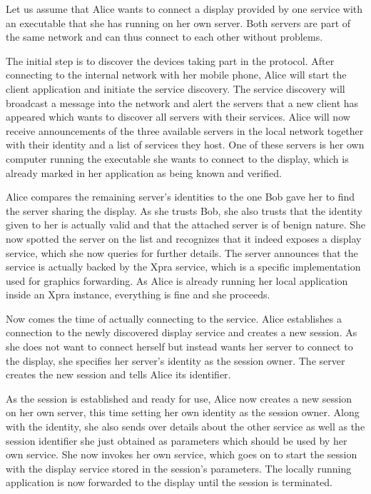 Let us assume that Alice wants to connect a display provided by one service with an executable that she has running on her own server.
Both servers are part of the same network and can thus connect to each other without problems.

The initial step is to discover the devices taking part in the protocol.
After connecting to the internal network with her mobile phone, Alice will start the client application and initiate the service discovery.
The service discovery will broadcast a message into the network and alert the servers that a new client has appeared which wants to discover all servers with their services.
Alice will now receive announcements of the three available servers in the local network together with their identity and a list of services they host.
One of these servers is her own computer running the executable she wants to connect to the display, which is already marked in her application as being known and verified.

Alice compares the remaining server's identities to the one Bob gave her to find the server sharing the display.
As she trusts Bob, she also trusts that the identity given to her is actually valid and that the attached server is of benign nature.
She now spotted the server on the list and recognizes that it indeed exposes a display service, which she now queries for further details.
The server announces that the service is actually backed by the Xpra service, which is a specific implementation used for graphics forwarding.
As Alice is already running her local application inside an Xpra instance, everything is fine and she proceeds.

Now comes the time of actually connecting to the service.
Alice establishes a connection to the newly discovered display service and creates a new session.
As she does not want to connect herself but instead wants her server to connect to the display, she specifies her server's identity as the session owner.
The server creates the new session and tells Alice its identifier.

As the session is established and ready for use, Alice now creates a new session on her own server, this time setting her own identity as the session owner.
Along with the identity, she also sends over details about the other service as well as the session identifier she just obtained as parameters which should be used by her own service.
She now invokes her own service, which goes on to start the session with the display service stored in the session's parameters.
The locally running application is now forwarded to the display until the session is terminated.\\

